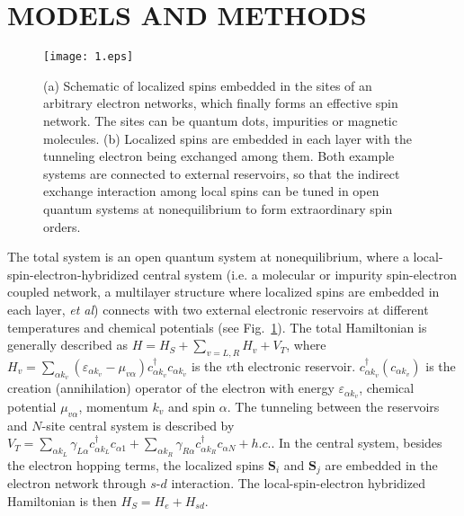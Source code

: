 \documentclass[aps,prb,twocolumn,showpacs,amssymb]{revtex4-1}
\begin{document}
\section{MODELS AND METHODS}\label{sec:model}
\begin{figure}[H]
\centering
\texttt{[image: 1.eps]}
\vspace{-0.6cm}
\caption{(a) Schematic of localized spins embedded in the sites of an arbitrary electron networks, which finally forms an effective spin network. The sites can be quantum dots, impurities or magnetic molecules. (b) Localized spins are embedded in each layer with the tunneling electron being exchanged among them. Both example systems are connected to external reservoirs, so that the indirect exchange interaction among local spins can be tuned in open quantum systems  at nonequilibrium to form extraordinary spin orders.}\label{fig:1}
\end{figure}

The total system is an open quantum system at nonequilibrium, where a local-spin-electron-hybridized central system (i.e. a molecular or impurity spin-electron coupled network, a multilayer structure where localized spins are embedded in each layer, \emph{et al}) connects with two external electronic reservoirs at different temperatures and chemical potentials (see Fig.~\ref{fig:1}).
The total Hamiltonian is generally described as $H=H_S+\sum_{v=L,R}H_{v}+V_T$, where
$H_{v}=\sum\limits_{{\alpha}k_{v}}(\varepsilon_{{\alpha}k_{v}}-\mu_{v{\alpha}})c_{{\alpha}k_{v}}^{\dagger}c_{{\alpha}k_{v}}$
is the $v$th electronic reservoir. $c_{{\alpha}k_{v}}^{\dagger}(c_{{\alpha}k_{v}})$ is the creation (annihilation) operator of the electron with energy $\varepsilon_{\alpha{k_{v}}}$, chemical potential $\mu_{v\alpha}$, momentum $k_{v}$ and spin $\alpha$. The tunneling between the reservoirs and $N$-site central system is described by $V_T=\sum\limits_{{\alpha}k_L}\gamma_{L\alpha}c_{{\alpha}k_L}^{\dagger}c_{{\alpha}1}+\sum\limits_{{\alpha}k_R}\gamma_{R\alpha}c_{{\alpha}k_R}^{\dagger}c_{{\alpha}N}+h.c.$.
In the central system, besides the electron hopping terms, the localized spins $\bm{S}_i$ and $\bm{S}_j$ are embedded in the electron network through $s$-$d$ interaction. The local-spin-electron hybridized Hamiltonian is then $H_S=H_e+H_{sd}$.
\end{document}
